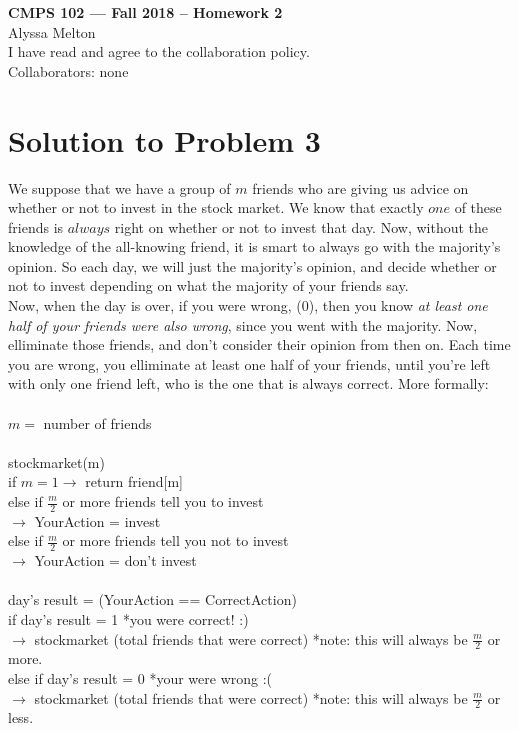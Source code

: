 \documentclass[11pt]{article}
\begin{document}
	
	\begin{center}
		{\bf\Large CMPS 102 --- Fall 2018 --  Homework 2}\\
		Alyssa Melton\\
		I have read and agree to the collaboration policy. \\
		Collaborators: none\\
	\end{center}
	
	
	\section*{Solution to Problem 3}
	We suppose that we have a group of $m$ friends who are giving us advice on whether or not to invest in the stock market. We know that exactly $one$ of these friends is $always$ right on whether or not to invest that day. Now, without the knowledge of the all-knowing friend, it is smart to always go with the majority's opinion. So each day, we will just the majority's opinion, and decide whether or not to invest depending on what the majority of your friends say. \\
	Now, when the day is over, if you were wrong, (0), then you know \textit{at least one half of your friends were also wrong}, since you went with the majority. Now, elliminate those friends, and don't consider their opinion from then on. Each time you are wrong, you elliminate at least one half of your friends, until you're left with only one friend left, who is the one that is always correct. More formally: \\
	\\
	$m =$ number of friends \\
	\\
	stockmarket(m)\\
	\indent	if $m = 1 \rightarrow$ return friend[m]\\
	\indent	else if $\frac{m}{2}$ or more friends tell you to invest \\
	\indent	\indent	$\rightarrow$ YourAction = invest\\
	\indent	else if $\frac{m}{2}$ or more friends tell you not to invest \\
	\indent	\indent	$\rightarrow$ YourAction = don't invest\\
	\\
	\indent	day's result = (YourAction == CorrectAction)\\
	\indent	if day's result = 1 *you were correct! :)\\
	\indent	\indent	$\rightarrow$ stockmarket (total friends that were correct)
	*note: this will always be $\frac{m}{2}$ or more.\\
	\indent	else if day's result = 0 *your were wrong :(\\
	\indent	\indent	$\rightarrow$ stockmarket (total friends that were correct) 
	*note: this will always be $\frac{m}{2}$ or less.\\
	
\end{document}
